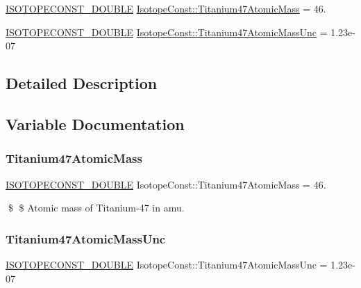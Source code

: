 \begin{DoxyCompactItemize}
\item 
\mbox{\hyperlink{group___isotope_const-_macros_ga8f45a7272ce02c0b4c65c44636ed719a}{I\+S\+O\+T\+O\+P\+E\+C\+O\+N\+S\+T\+\_\+\+D\+O\+U\+B\+LE}} \mbox{\hyperlink{group___isotope_const-_titanium-_ti47_ga7b32861667d7e28919b952a7b03a556f}{Isotope\+Const\+::\+Titanium47\+Atomic\+Mass}} = 46.
\item 
\mbox{\hyperlink{group___isotope_const-_macros_ga8f45a7272ce02c0b4c65c44636ed719a}{I\+S\+O\+T\+O\+P\+E\+C\+O\+N\+S\+T\+\_\+\+D\+O\+U\+B\+LE}} \mbox{\hyperlink{group___isotope_const-_titanium-_ti47_gabe62005cde3d3c39aa84b3e95a49cc88}{Isotope\+Const\+::\+Titanium47\+Atomic\+Mass\+Unc}} = 1.\+23e-\/07
\end{DoxyCompactItemize}


\subsection{Detailed Description}


\subsection{Variable Documentation}
\mbox{\label{group___isotope_const-_titanium-_ti47_ga7b32861667d7e28919b952a7b03a556f}} 
\subsubsection{\texorpdfstring{Titanium47\+Atomic\+Mass}{Titanium47AtomicMass}}
{\footnotesize\ttfamily \mbox{\hyperlink{group___isotope_const-_macros_ga8f45a7272ce02c0b4c65c44636ed719a}{I\+S\+O\+T\+O\+P\+E\+C\+O\+N\+S\+T\+\_\+\+D\+O\+U\+B\+LE}} Isotope\+Const\+::\+Titanium47\+Atomic\+Mass = 46.}

\$ \$ Atomic mass of Titanium-\/47 in amu. \mbox{\label{group___isotope_const-_titanium-_ti47_gabe62005cde3d3c39aa84b3e95a49cc88}} 
\subsubsection{\texorpdfstring{Titanium47\+Atomic\+Mass\+Unc}{Titanium47AtomicMassUnc}}
{\footnotesize\ttfamily \mbox{\hyperlink{group___isotope_const-_macros_ga8f45a7272ce02c0b4c65c44636ed719a}{I\+S\+O\+T\+O\+P\+E\+C\+O\+N\+S\+T\+\_\+\+D\+O\+U\+B\+LE}} Isotope\+Const\+::\+Titanium47\+Atomic\+Mass\+Unc = 1.\+23e-\/07}

